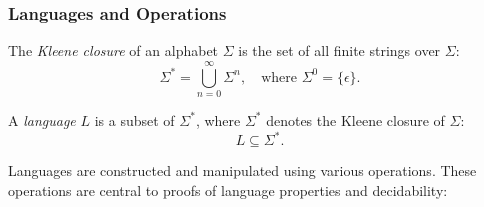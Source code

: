 \subsubsection{Languages and Operations}
\begin{definition}
    The \textit{Kleene closure} \cite{kleene1956representation} of an alphabet $\Sigma$ is the set of all finite strings over $\Sigma$:
    \[
    \Sigma^\ast = \bigcup_{n=0}^\infty \Sigma^n, \quad \text{where } \Sigma^0 = \{\epsilon\}.
    \]
\end{definition}

\begin{definition}[Language]
    A \textit{language} $L$ is a subset of $\Sigma^\ast$, where $\Sigma^\ast$ denotes the Kleene closure of $\Sigma$:
    \[
    L \subseteq \Sigma^\ast.
    \]
\end{definition}

Languages are constructed and manipulated using various operations. These operations are central to proofs of language properties and decidability:

